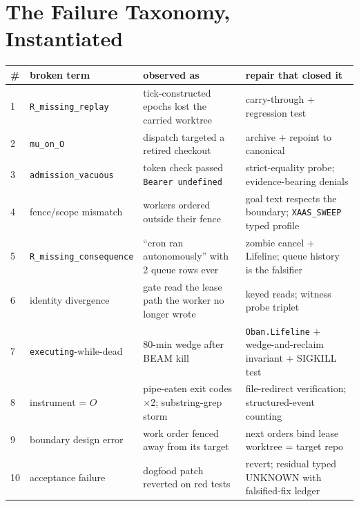 \documentclass[11pt,a4paper]{article}
\theoremstyle{remark}
\newcommand{\term}[1]{\texttt{#1}}
\begin{document}
\appendix
\section{The Failure Taxonomy, Instantiated}
\begin{longtable}{@{}p{0.4cm}p{2.9cm}p{6.2cm}p{6.2cm}@{}}
\toprule
\# & broken term & observed as & repair that closed it \\
\midrule
1 & \term{R\_missing\_replay} & tick-constructed epochs lost the carried worktree & carry-through + regression test \\
2 & \term{mu\_on\_O} & dispatch targeted a retired checkout & archive + repoint to canonical \\
3 & \term{admission\_vacuous} & token check passed \term{Bearer undefined} & strict-equality probe; evidence-bearing denials \\
4 & fence/scope mismatch & workers ordered outside their fence & goal text respects the boundary; \term{XAAS\_SWEEP} typed profile \\
5 & \term{R\_missing\_consequence} & ``cron ran autonomously'' with 2 queue rows ever & zombie cancel + Lifeline; queue history is the falsifier \\
6 & identity divergence & gate read the lease path the worker no longer wrote & keyed reads; witness probe triplet \\
7 & \term{executing}-while-dead & 80-min wedge after BEAM kill & \term{Oban.Lifeline} + wedge-and-reclaim invariant + SIGKILL test \\
8 & instrument = $O$ & pipe-eaten exit codes $\times$2; substring-grep storm & file-redirect verification; structured-event counting \\
9 & boundary design error & work order fenced away from its target & next orders bind lease worktree = target repo \\
10 & acceptance failure & dogfood patch reverted on red tests & revert; residual typed UNKNOWN with falsified-fix ledger \\
\bottomrule
\end{longtable}
\end{document}
